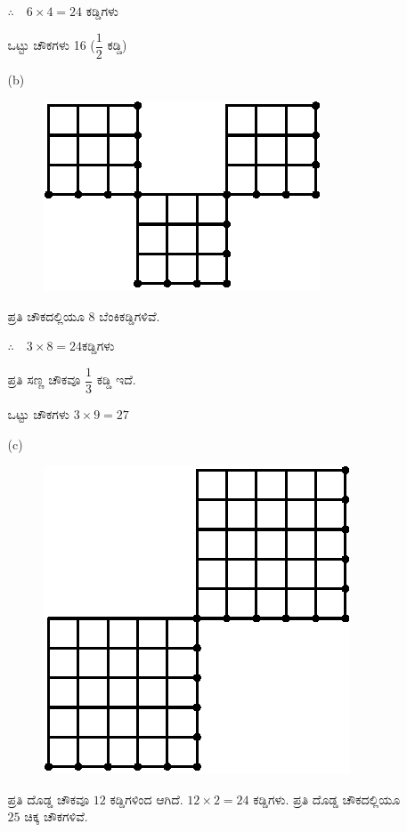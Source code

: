 \begin{enumerate}
\begin{itemize}
\begin{minipage}[c]{4cm}
$\therefore\quad 6\times 4 = 24$ ಕಡ್ಡಿಗಳು 

ಒಟ್ಟು ಚೌಕಗಳು 16 ($\dfrac{1}{2}$ ಕಡ್ಡಿ)
\end{minipage}

\smallskip

\item[(b)]
~

\begin{minipage}[c]{5cm}
\begin{figure}[H]
\centering
\includegraphics[scale=1.1]{images/chap7/ans11b.eps}
\end{figure}
\end{minipage}
\begin{minipage}[c]{4cm}
ಪ್ರತಿ ಚೌಕದಲ್ಲಿಯೂ 8 ಬೆಂಕಿಕಡ್ಡಿಗಳಿವೆ. 

$\therefore\quad 3 \times 8 = 24$ಕಡ್ಡಿಗಳು 

ಪ್ರತಿ ಸಣ್ಣ ಚೌಕವೂ $\dfrac{1}{3}$ ಕಡ್ಡಿ ಇದೆ. 

ಒಟ್ಟು ಚೌಕಗಳು $3 \times 9 = 27$
\end{minipage}

\medskip

\item[(c)] 
~

\begin{minipage}[c]{5cm}
\begin{figure}[H]
\centering
\includegraphics[scale=1.1]{images/chap7/ans11c.eps}
\end{figure}
\end{minipage}
\begin{minipage}[c]{4cm}
ಪ್ರತಿ ದೊಡ್ಡ ಚೌಕವೂ $12$ ಕಡ್ಡಿ\-ಗಳಿಂದ ಆಗಿದೆ. $12 \times 2 = 24$ ಕಡ್ಡಿಗಳು. ಪ್ರತಿ ದೊಡ್ಡ ಚೌಕದಲ್ಲಿಯೂ $25$ ಚಿಕ್ಕ ಚೌಕಗಳಿವೆ. 


\end{minipage}
\end{itemize}
\end{enumerate}
